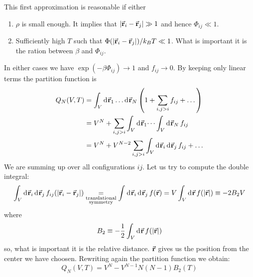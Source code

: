 \documentclass[../main/main.tex]{subfiles}
\begin{document}



This first approximation is reasonable if either
\begin{enumerate}
\item \( \rho  \) is small enough. It implies that \( \abs{\va{r}_i - \va{r}_j} \gg 1 \) and hence \( \Phi _{ij} \ll 1 \).
\item Sufficiently high \( T \) such that \( \Phi (\abs{\va{r}_i - \va{r}_j} )/k_B T \ll 1 \). What is important it is the ration between \( \beta  \)  and \( \Phi _{ij} \).
\end{enumerate}
In either cases we have \( \exp (- \beta \Phi _{ij}) \rightarrow 1 \) and \( f_{ij} \rightarrow 0 \). By keeping only linear terms the partition function is
\begin{equation}
\begin{split}
  Q_N (V,T) &= \int_{V}^{} \dd[]{\va{r}_1} \dots \dd[]{\va{r}_N} \qty(1+ \sum_{i,j>i}^{} f_{ij} + \dots )  \\
  &= V^N + \sum_{i,j>i}^{} \int_{V}^{} \dd[]{\va{r}_1} \dots \int_{V}^{}  \dd[]{\va{r}_N} f_{ij} \\
  &= V^N + V^{N-2} \sum_{i,j>i}^{} \int_{V}^{} \dd[]{\va{r}_i} \dd[]{\va{r}_j} f_{ij} + \dots \\
\end{split}
\end{equation}
We are summing up over all configurations \( ij \). Let us try to compute the double integral:
\begin{equation}
  \int_{V}^{} \dd[]{\va{r}_i} \dd[]{\va{r}_j} f_{ij} (\abs{\va{r}_i - \va{r}_j} ) \underset{\substack{ \text{translational} \\  \text{symmetry} } }{=}  \int_{}^{} \dd[]{\va{r}_i} \dd[]{\va{r}_j} f (\va{r})
  = V \int_{V}^{} \dd[]{\va{r}}  f \qty(\abs{\va{r}} ) \equiv -2 B_2 V
\end{equation}
where
\begin{equation}
  B_2 \equiv - \frac{1}{2} \int_{V}^{} \dd[]{\va{r}}  f \qty(\abs{\va{r}} )
\end{equation}
so, what is important it is the relative distance. \( \va{r} \) gives us the position from the center we have choosen.
Rewriting again the partition function we obtain:
\begin{equation}
  Q_N (V,T) = V^N - V^{N-1} N (N-1) B_2 (T)
\end{equation}
\end{document}
